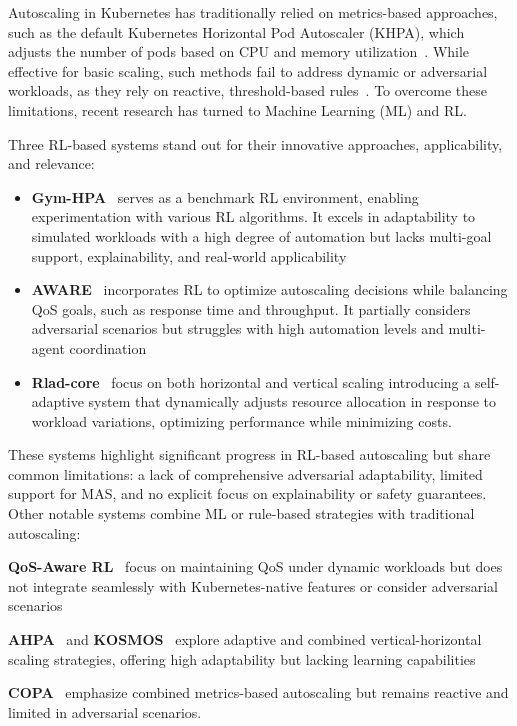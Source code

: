 \documentclass[conference]{IEEEtran}
\begin{document}
\noindent Autoscaling in Kubernetes has traditionally relied on metrics-based approaches, such as the default Kubernetes Horizontal Pod Autoscaler (KHPA), which adjusts the number of pods based on CPU and memory utilization~\cite{Carrion2022}. While effective for basic scaling, such methods fail to address dynamic or adversarial workloads, as they rely on reactive, threshold-based rules~\cite{Tran2022}. To overcome these limitations, recent research has turned to Machine Learning (ML) and RL.

Three RL-based systems stand out for their innovative approaches, applicability, and relevance:
%
\begin{itemize}
    \item \textbf{Gym-HPA}~\cite{gymhpa2022} serves as a benchmark RL environment, enabling experimentation with various RL algorithms. It excels in adaptability to simulated workloads with a high degree of automation but lacks multi-goal support, explainability, and real-world applicability
    \item \textbf{AWARE}~\cite{aware2023} incorporates RL to optimize autoscaling decisions while balancing QoS goals, such as response time and throughput. It partially considers adversarial scenarios but struggles with high automation levels and multi-agent coordination
    \item \textbf{Rlad-core}~\cite{Rossi2019} focus on both horizontal and vertical scaling introducing a self-adaptive system that dynamically adjusts resource allocation in response to workload variations, optimizing performance while minimizing costs.
\end{itemize}

These systems highlight significant progress in RL-based autoscaling but share common limitations: a lack of comprehensive adversarial adaptability, limited support for MAS, and no explicit focus on explainability or safety guarantees.
%
Other notable systems combine ML or rule-based strategies with traditional autoscaling:
%
\begin{enumerate*}[label={}, itemjoin={;\quad }]
    \item \textbf{QoS-Aware RL}~\cite{QoSRL} focus on maintaining QoS under dynamic workloads but does not integrate seamlessly with Kubernetes-native features or consider adversarial scenarios
    \item \textbf{AHPA}~\cite{Zhou2024} and \textbf{KOSMOS}~\cite{KOSMOS} explore adaptive and combined vertical-horizontal scaling strategies, offering high adaptability but lacking learning capabilities
    \item \textbf{COPA}~\cite{COPA} emphasize combined metrics-based autoscaling but remains reactive and limited in adversarial scenarios.
\end{enumerate*}
\end{document}
